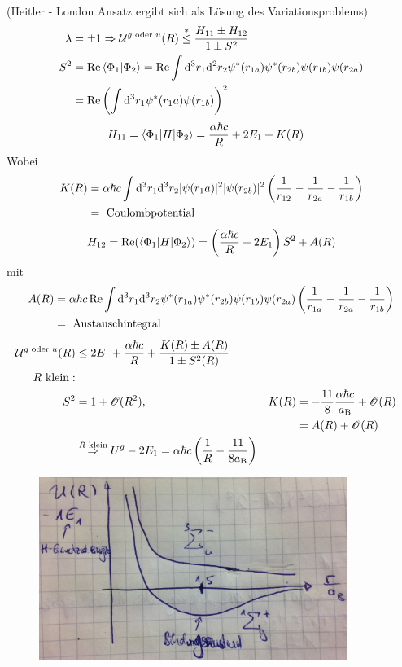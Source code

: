(Heitler - London Ansatz ergibt sich als Lösung des Variationsproblems)
	\begin{align*}
		\lambda &= \pm 1 \Rightarrow \mathcal{U}^{g \text{ oder }u} (R) 
		\overset{*}{\leq} \frac{H_{11} \pm H_{12}}{1 \pm S^2} \\
		S^2 &= \mathrm{Re}\braket{\Phi_1 | \Phi_2} 
		= \mathrm{Re} \int \mathrm{d}^3 r_1 \mathrm{d}^2 r_2 \psi^* (r_{1a}) \psi^* (r_{2b}) \psi(r_{1b}) \psi (r_{2a}) \\
		&= \mathrm{Re} \left(\int \mathrm{d}^3 r_1 \psi^*(r_1a) \psi (r_{1b})\right)^2 \\
	\end{align*}
	\begin{align*}
		H_{11} &= \braket{\Phi_1 | H | \Phi_2} =
		\frac{\alpha \hbar c}{R} + 2 E_1 + K(R)
	\end{align*}
Wobei 
	\begin{align*}
		K(R) &= \alpha \hbar c \int \mathrm{d}^3 r_1 \mathrm{d}^3 r_2 |\psi (r_1a)|^2 
		|\psi (r_{2b})|^2 \left(\frac{1}{r_{12}} - \frac{1}{r_{2a}} - \frac{1}{r_{1b}}\right) \\
		&= \text{ Coulombpotential}
	\end{align*}
	\begin{align*}
		H_{12} = \mathrm{Re} (\braket{\Phi_1 | H | \Phi_2}) 
		= \left(\frac{\alpha \hbar c}{R} + 2 E_1\right) S^2 + A(R) 
	\end{align*}
mit 
	\begin{align*}
		A(R) &= \alpha \hbar c \,\mathrm{Re} \int \mathrm{d}^3 r_1 \mathrm{d}^3 r_2 \psi^* (r_{1a}) \psi^* (r_{2b}) \psi(r_{1b}) \psi (r_{2a}) \left(\frac{1}{r_{1a}} - \frac{1}{r_{2a}} - \frac{1}{r_{1b}}\right)\\
		&= \text{ Austauschintegral}
	\end{align*}
	\begin{align*}
		\mathcal{U}^{g \text{ oder }u} (R) &\leq 2 E_1 + \frac{\alpha \hbar c}{R} + 
		\frac{K(R) \pm A(R)}{1 \pm S^2(R)} \\
		R \text{ klein}:& \\
		S^2 &= 1 + \mathscr{O} (R^2) ,&
		K(R) &= - \frac{11}{8} \frac{\alpha \hbar c}{a_{\mathrm{B}}} + \mathscr{O} (R) \\
		& & &= A(R) + \mathscr{O} (R)\\
		&\overset{R \text{ klein}}{\Rightarrow} U^g - 2E_1 = \alpha \hbar c 
		\left(\frac{1}{R} - \frac{11}{8 a_{\mathrm{B}}}\right) 
	\end{align*}
	\begin{figure} [h]
		\begin{center}
			\includegraphics[width=10cm]{Homonukleare_Molekuele4}
		\end{center}
	\end{figure}
